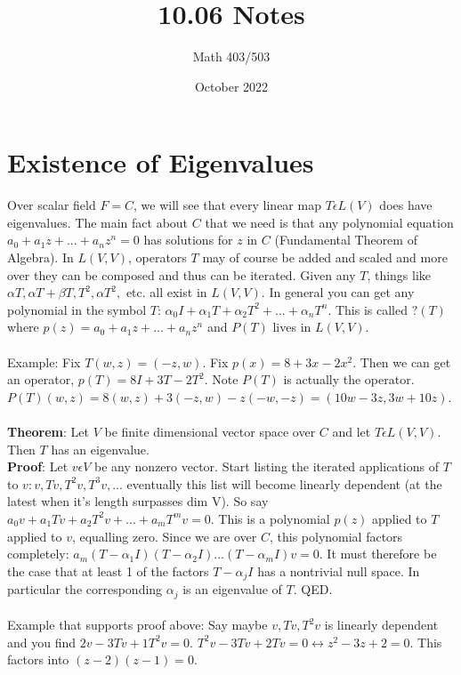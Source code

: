 \documentclass{article}
\title{10.06 Notes}
\author{Math 403/503}
\date{October 2022}
\begin{document}
\maketitle

\section{Existence of Eigenvalues}
Over scalar field $F = C$, we will see that every linear map $T \epsilon L(V)$ does have eigenvalues. The main fact about $C$ that we need is that any polynomial equation $a_0+a_1z+...+a_nz^n= 0$ has solutions for $z$ in $C$ (Fundamental Theorem of Algebra). In $L(V,V)$, operators $T$ may of course be added and scaled and more over they can be composed and thus can be iterated. Given any $T$, things like $\alpha T, \alpha T + \beta T, T^2, \alpha T^2, $ etc. all exist in $L(V,V)$. In general you can get any polynomial in the symbol $T$: 
$\alpha_0 I + \alpha_1 T + \alpha_2 T^2 + ... + \alpha_n T^n$. This is called $?(T)$ where $p(z) = a_0 + a_1z + ... + a_nz^n$ and $P(T)$ lives in $L(V,V)$. \\\\
Example: Fix $T(w,z) = (-z,w)$. Fix $p(x) = 8 +3x-2x^2$. Then we can get an operator, $p(T) = 8I + 3T - 2T^2$. Note $P(T)$ is actually the operator. $P(T)(w,z) = 8(w,z) + 3(-z,w) - z(-w,-z) = (10w - 3z, 3w+10z)$. \\\\
\textbf{Theorem}: Let $V$ be finite dimensional vector space over $C$ and let $T \epsilon L(V,V)$. Then $T$ has an eigenvalue. \\
\textbf{Proof}: Let $v \epsilon V$ be any nonzero vector. Start listing the iterated applications of $T$ to $v: v, Tv, T^2v, T^3v, ...$ eventually this list will become linearly dependent (at the latest when it's length surpasses dim V). So say $a_0v + a_1Tv + a_2T^2v + ... + a_mT^mv = 0$. This is a polynomial $p(z)$ applied to $T$ applied to $v$, equalling zero. Since we are over $C$, this polynomial factors completely: $a_m(T - \alpha_1 I)(T-\alpha_2 I)...(T-\alpha_m I)v = 0$. It must therefore be the case that at least 1 of the factors $T - \alpha_j I$ has a nontrivial null space. In particular the corresponding $\alpha_j$ is an eigenvalue of $T$. QED. \\\\
Example that supports proof above: Say maybe $v, Tv, T^2v$ is linearly dependent and you find $2v - 3Tv + 1T^2v = 0$. $T^2v - 3Tv + 2Tv = 0 \leftrightarrow z^2-3z+2 = 0$. This factors into $(z-2)(z-1)=0$. \\
\end{document}
